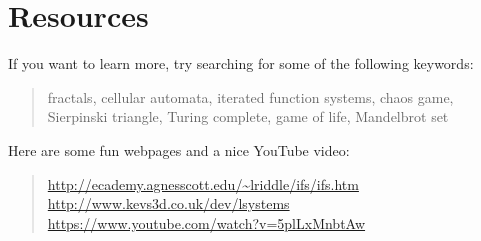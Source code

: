 \documentclass{article}
\begin{document}
\section*{Resources}

If you want to learn more, try searching for some of the following keywords:
\begin{quote}
		fractals, cellular automata, iterated function systems, chaos game, \\Sierpinski triangle, Turing complete, game of life, Mandelbrot set
\end{quote}

\noindent Here are some fun webpages and a nice YouTube video:
\begin{quote}
	\url{http://ecademy.agnesscott.edu/~lriddle/ifs/ifs.htm}\\
	\url{http://www.kevs3d.co.uk/dev/lsystems}\\
	\url{https://www.youtube.com/watch?v=5plLxMnbtAw}
\end{quote}
\end{document}
